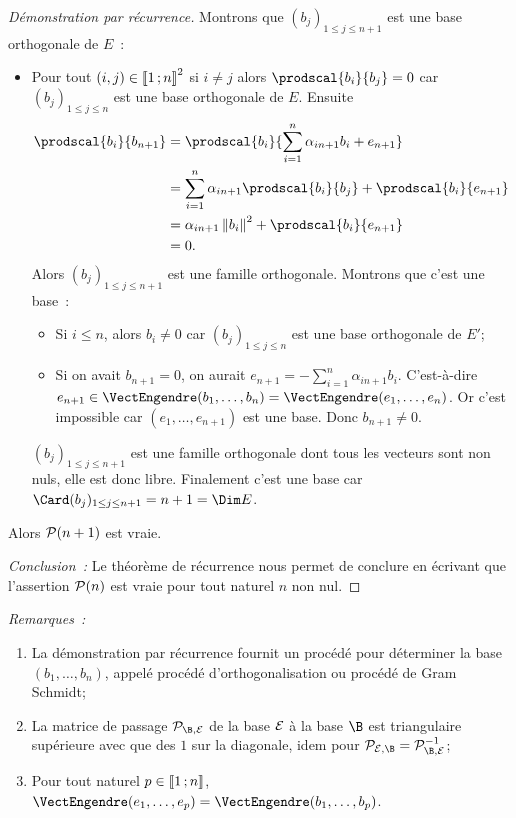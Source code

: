 \begin{proof}[Démonstration par récurrence]
  Montrons que $(b_j)_{1 \leq j \leq n+1}$ est une base orthogonale de $E$~:
  \begin{itemize}
  \item Pour tout $(i,j) \in \intervalleentier{1}{n}^2$ si $i \neq j$ alors $\prodscal{b_i}{b_j}=0$ car $(b_j)_{1 \leq j \leq n}$ est une base orthogonale de $E$. Ensuite
    \begin{align}
      \prodscal{b_i}{b_{n+1}} &= \prodscal{b_i}{\sum_{i=1}^{n} \alpha_{i n+1}b_i  + e_{n+1}} \\
      & = \sum_{i=1}^{n} \alpha_{i n+1} \prodscal{b_i}{b_j} + \prodscal{b_i}{e_{n+1}} \\
      &=\alpha_{i n+1} \norme{b_i}^2 + \prodscal{b_i}{e_{n+1}} \\
      &=0.
    \end{align}
    Alors $(b_j)_{1 \leq j \leq n+1}$  est une famille orthogonale. Montrons que c'est une base~:
    \begin{itemize}
    \item Si $i \leq n$, alors $b_i \neq 0$ car $(b_j)_{1 \leq j \leq n}$ est une base orthogonale de $E'$;
    \item Si on avait $b_{n+1}=0$, on aurait $e_{n+1}= -\sum_{i=1}^{n} \alpha_{i n+1}b_i$. C'est-à-dire $e_{n+1} \in \VectEngendre(b_1, \ldots, b_n) = \VectEngendre(e_1, \ldots, e_n)$. Or c'est impossible car $(e_1, \ldots, e_{n+1})$ est une base. Donc $b_{n+1} \neq 0$.
    \end{itemize}
    $(b_j)_{1 \leq j \leq n+1}$  est une famille orthogonale dont tous les vecteurs sont non nuls, elle est donc libre. Finalement c'est une base car $\Card(b_j)_{1 \leq j \leq n+1}=n+1=\Dim E$.
  \end{itemize}
  Alors $\P(n+1)$ est vraie.

  \emph{Conclusion~:} Le théorème de récurrence nous permet de conclure en écrivant que l'assertion $\P(n)$ est vraie pour tout naturel $n$ non nul.
\end{proof}

\emph{Remarques~:}
\begin{enumerate}
\item La démonstration par récurrence fournit un procédé pour déterminer la base $(b_1, \ldots, b_n)$, appelé procédé d'orthogonalisation ou procédé de Gram Schmidt;
\item La matrice de passage $\P_{\B,\E}$ de la base $\E$ à la base $\B$ est triangulaire supérieure avec que des $1$ sur la diagonale, idem pour $\P_{\E,\B}=\P_{\B,\E}^{-1}$;
\item Pour tout naturel $p \in \intervalleentier{1}{n}$, $\VectEngendre(e_1, \ldots, e_p)=\VectEngendre(b_1, \ldots, b_p)$.
\end{enumerate}

